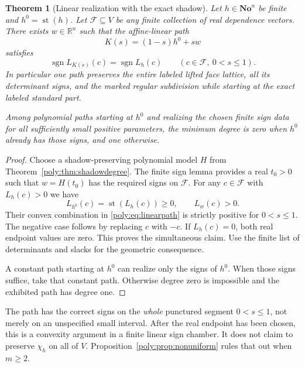 \documentclass[11pt,a4paper]{article}
\numberwithin{equation}{section}
\newtheorem{theorem}{Theorem}[section]
\theoremstyle{plain}
\newcommand{\No}{\mathbf{No}}
\newcommand{\R}{\mathbb R}
\newcommand{\st}{\operatorname{st}}
\newcommand{\sgn}{\operatorname{sgn}}
\newcommand{\cF}{\mathcal F}
\begin{document}
\begin{theorem}[Linear realization with the exact shadow]\label{poly:thm:linear}
Let $h\in\No^n$ be finite and $h^0=\st(h)$. Let $\cF\subseteq V$
be any finite collection of real dependence vectors. There exists
$w\in\R^n$ such that the affine-linear path
\begin{equation}\label{poly:eq:linearpath}
 K(s)=(1-s)h^0+sw
\end{equation}
satisfies
\[
 \sgn L_{K(s)}(c)=\sgn L_h(c)
 \qquad(c\in\cF,\ 0<s\le1).
\]
In particular one path preserves the entire labeled lifted face lattice,
all its determinant signs, and the marked regular subdivision while
starting at the exact labeled standard part.

Among polynomial paths starting at $h^0$ and realizing the chosen finite
sign data for all sufficiently small positive parameters, the minimum
degree is zero when $h^0$ already has those signs, and one otherwise.
\end{theorem}
\begin{proof}
Choose a shadow-preserving polynomial model $H$ from
Theorem~\ref{poly:thm:shadowdegree}. The finite sign lemma provides a real
$t_0>0$ such that $w=H(t_0)$ has the required signs on $\cF$.
For any $c\in\cF$ with $L_h(c)>0$ we have
\[
 L_{h^0}(c)=\st(L_h(c))\ge0,\qquad L_w(c)>0.
\]
Their convex combination in \eqref{poly:eq:linearpath} is strictly positive
for $0<s\le1$. The negative case follows by replacing $c$ with $-c$.
If $L_h(c)=0$, both real endpoint values are zero. This proves the
simultaneous claim. Use the finite list of determinants and slacks for
the geometric consequence.

A constant path starting at $h^0$ can realize only the signs of $h^0$.
When those signs suffice, take that constant path. Otherwise degree zero
is impossible and the exhibited path has degree one.
\end{proof}

\begin{remark}
The path has the correct signs on the \emph{whole} punctured segment
$0<s\le1$, not merely on an unspecified small interval. After the real
endpoint has been chosen, this is a convexity argument in a finite linear
sign chamber. It does not claim to preserve $\chi_h$ on all of $V$.
Proposition~\ref{poly:prop:nonuniform} rules that out when $m\ge2$.
\end{remark}
\end{document}

